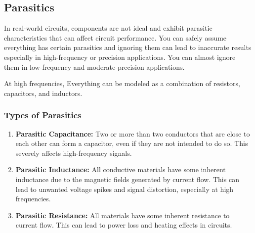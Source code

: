 \subsection{Parasitics}\label{sec:theory_general_parasitics}


In real-world circuits, components are not ideal and exhibit
parasitic characteristics that can affect circuit performance.
You can safely assume everything has certain parasitics and
ignoring them can lead to inaccurate results especially in
high-frequency or precision applications. You can almost ignore
them in low-frequency and moderate-precision applications.

At high frequencies, Everything can be modeled as a combination
of resistors, capacitors, and inductors.

\subsubsection{Types of Parasitics}
\begin{enumerate}
  \item \textbf{Parasitic Capacitance:} Two or more than two
    conductors that are close to each other can form a
    capacitor, even if they are not intended to do so. This
    severely affects high-frequency signals.
  \item \textbf{Parasitic Inductance:} All conductive materials
    have some inherent inductance due to the magnetic fields
    generated by current flow. This can lead to unwanted
    voltage spikes and signal distortion, especially at high
    frequencies.
  \item \textbf{Parasitic Resistance:} All materials have some
    inherent resistance to current flow. This can lead to
    power loss and heating effects in circuits.
\end{enumerate}

